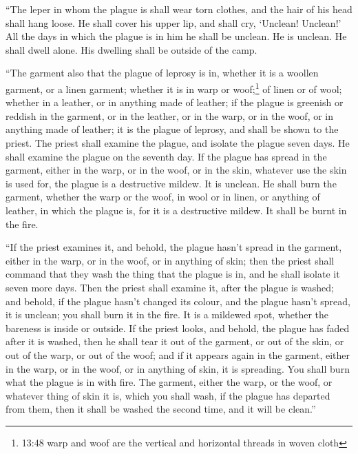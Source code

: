  ``The leper in whom the plague is shall wear torn clothes,
and the hair of his head shall hang loose. He shall cover his upper lip,
and shall cry, `Unclean! Unclean!'  All the days in which
the plague is in him he shall be unclean. He is unclean. He shall dwell
alone. His dwelling shall be outside of the camp.

 ``The garment also that the plague of leprosy is in,
whether it is a woollen garment, or a linen garment; 
whether it is in warp or woof;\footnote{13:48 warp and woof are the
  vertical and horizontal threads in woven cloth} of linen or of wool;
whether in a leather, or in anything made of leather;  if
the plague is greenish or reddish in the garment, or in the leather, or
in the warp, or in the woof, or in anything made of leather; it is the
plague of leprosy, and shall be shown to the priest.  The
priest shall examine the plague, and isolate the plague seven days.
 He shall examine the plague on the seventh day. If the
plague has spread in the garment, either in the warp, or in the woof, or
in the skin, whatever use the skin is used for, the plague is a
destructive mildew. It is unclean.  He shall burn the
garment, whether the warp or the woof, in wool or in linen, or anything
of leather, in which the plague is, for it is a destructive mildew. It
shall be burnt in the fire.

 ``If the priest examines it, and behold, the plague hasn't
spread in the garment, either in the warp, or in the woof, or in
anything of skin;  then the priest shall command that they
wash the thing that the plague is in, and he shall isolate it seven more
days.  Then the priest shall examine it, after the plague
is washed; and behold, if the plague hasn't changed its colour, and the
plague hasn't spread, it is unclean; you shall burn it in the fire. It
is a mildewed spot, whether the bareness is inside or outside.
 If the priest looks, and behold, the plague has faded
after it is washed, then he shall tear it out of the garment, or out of
the skin, or out of the warp, or out of the woof;  and if
it appears again in the garment, either in the warp, or in the woof, or
in anything of skin, it is spreading. You shall burn what the plague is
in with fire.  The garment, either the warp, or the woof,
or whatever thing of skin it is, which you shall wash, if the plague has
departed from them, then it shall be washed the second time, and it will
be clean.''

